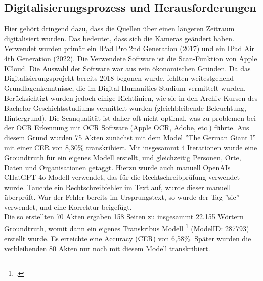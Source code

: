 \documentclass[12pt, a4paper, ngerman, bidi=default]{article}
\renewcommand{\cite}{\footcite}
\begin{document}
\subsection{Digitalisierungsprozess und Herausforderungen}
    Hier gehört dringend dazu, dass die Quellen über einen längeren Zeitraum digitalisiert wurden. Das bedeutet, dass sich die Kameras geändert haben. 
    Verwendet wurden primär ein IPad Pro 2nd Generation (2017) und ein IPad Air 4th Generation (2022). Die Verwendete Software ist die Scan-Funktion von Apple ICloud. 
    Die Auswahl der Software war aus rein ökonomischen Gründen. Da das Digitalisierungsprojekt bereits 2018 begonen wurde, fehlten weitestgehend Grundlagenkenntnisse, 
    die im Digital Humanities Studium vermittelt wurden. Berücksichtigt wurden jedoch einige Richtlinien, wie sie in den Archiv-Kursen des Bachelor-Geschichtsstudiums vermittelt wurden 
    (gleichbleibende Beleuchtung, Hintergrund). Die Scanqualität ist daher oft nicht optimal, was zu problemen bei der OCR Erkennung mit OCR Software (Apple OCR, Adobe, etc.) führte. 
    Aus diesem Grund wurden 75 Akten zunächst mit dem Model ”The German Giant I” mit einer CER von 8,30\% transkribiert. Mit insgesammt 4 Iterationen wurde eine Groundtruth 
    für ein eigenes Modell erstellt, und gleichzeitig Personen, Orte, Daten und Organisationen getaggt. Hierzu wurde auch manuell OpenAIs CHatGPT 4o Modell verwendet, das für die 
    Rechtschreibprüfung verwendet wurde. Tauchte ein Rechtschreibfehler im Text auf, wurde dieser manuell überprüft. War der Fehler bereits im Ursprungstext, so wurde der Tag ”sic” verwendet,
    und eine Korrektur beigefügt.\\
    Die so erstellten 70 Akten ergaben 158 Seiten zu insgesammt 22.155 Wörtern Groundtruth, womit dann ein eigenes Transkribus Modell \cite{burkhardt_transkribus_nodate}
    (\href{https://app.transkribus.org/models/public/287793}{ModelID: 287793}) erstellt wurde. Es erreichte eine Accuracy (CER) von 6,58\%. Später wurden die verbleibenden 80 Akten nur noch 
    mit diesem Modell transkribiert. \\
  
\end{document}
